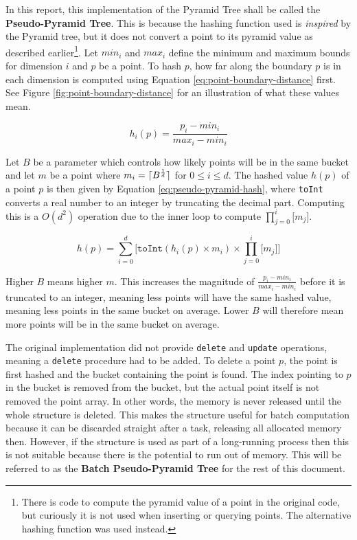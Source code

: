 In this report, this implementation of the Pyramid Tree shall be called the \textbf{Pseudo-Pyramid Tree}. This is because the hashing function used is \textit{inspired} by the Pyramid tree, but it does not convert a point to its pyramid value as described earlier\footnote{There is code to compute the pyramid value of a point in the original code, but curiously it is not used when inserting or querying points. The alternative hashing function was used instead.}. Let $min_i$ and $max_i$ define the minimum and maximum bounds for dimension $i$ and $p$ be a point. To hash $p$, how far along the boundary $p$ is in each dimension is computed using Equation \ref{eq:point-boundary-distance} first. See Figure \ref{fig:point-boundary-distance} for an illustration of what these values mean.


\begin{equation}
	h_i(p) = \frac{p_i - min_i}{max_i - min_i}
	\label{eq:point-boundary-distance}
\end{equation}

Let $B$ be a parameter which controls how likely points will be in the same bucket and let $m$ be a point where $m_i = \lceil B^{\frac{1}{d}}\rceil$ for $0 \leq i \leq d$. The hashed value $h(p)$ of a point $p$ is then given by Equation \ref{eq:pseudo-pyramid-hash},  where \texttt{toInt} converts a real number to an integer by truncating the decimal part. Computing this is a $O(d^2)$ operation due to the inner loop to compute $\prod_{j=0}^{i}{\lbrack m_j \rbrack}$.

\begin{equation}
	h(p) = \sum_{i = 0}^{d} { \lbrack \texttt{toInt}( h_i(p) \times m_i ) \times \prod_{j=0}^{i}{\lbrack m_j \rbrack} \rbrack }
	\label{eq:pseudo-pyramid-hash}
\end{equation}

Higher $B$ means higher $m$. This increases the magnitude of $\frac{p_i - min_i}{max_i - min_i}$ before it is truncated to an integer, meaning less points will have the same hashed value, meaning less points in the same bucket on average. Lower $B$ will therefore mean more points will be in the same bucket on average.

The original implementation did not provide \texttt{delete} and \texttt{update} operations, meaning a \texttt{delete} procedure had to be added. To delete a point $p$, the point is first hashed and the bucket containing the point is found. The index pointing to $p$ in the bucket is removed from the bucket, but the actual point itself is not removed the point array. In other words, the memory is never released until the whole structure is deleted. This makes the structure useful for batch computation because it can be discarded straight after a task, releasing all allocated memory then. However, if the structure is used as part of a long-running process then this is not suitable because there is the potential to run out of memory. This will be referred to as the \textbf{Batch Pseudo-Pyramid Tree} for the rest of this document.


